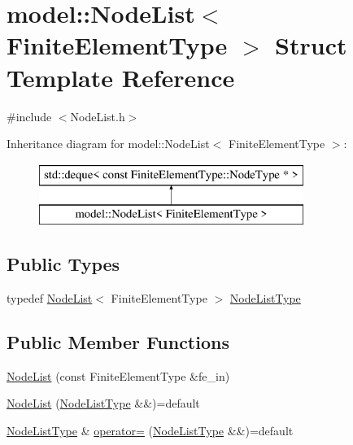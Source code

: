 \hypertarget{structmodel_1_1_node_list}{}\section{model\+:\+:Node\+List$<$ Finite\+Element\+Type $>$ Struct Template Reference}
\label{structmodel_1_1_node_list}


{\ttfamily \#include $<$Node\+List.\+h$>$}

Inheritance diagram for model\+:\+:Node\+List$<$ Finite\+Element\+Type $>$\+:\begin{figure}[H]
\begin{center}
\leavevmode
\includegraphics[height=2.000000cm]{structmodel_1_1_node_list}
\end{center}
\end{figure}
\subsection*{Public Types}
\begin{DoxyCompactItemize}
\item 
typedef \hyperlink{structmodel_1_1_node_list}{Node\+List}$<$ Finite\+Element\+Type $>$ \hyperlink{structmodel_1_1_node_list_a75ab0962bbd6a25440cfccbc5458fd5f}{Node\+List\+Type}
\end{DoxyCompactItemize}
\subsection*{Public Member Functions}
\begin{DoxyCompactItemize}
\item 
\hyperlink{structmodel_1_1_node_list_a63c6515a984f86f181910be861572676}{Node\+List} (const Finite\+Element\+Type \&fe\+\_\+in)
\item 
\hyperlink{structmodel_1_1_node_list_adcf55397a767c823301a9d32680176c0}{Node\+List} (\hyperlink{structmodel_1_1_node_list_a75ab0962bbd6a25440cfccbc5458fd5f}{Node\+List\+Type} \&\&)=default
\item 
\hyperlink{structmodel_1_1_node_list_a75ab0962bbd6a25440cfccbc5458fd5f}{Node\+List\+Type} \& \hyperlink{structmodel_1_1_node_list_a74608e1e5636f6f3897dd2edad33379f}{operator=} (\hyperlink{structmodel_1_1_node_list_a75ab0962bbd6a25440cfccbc5458fd5f}{Node\+List\+Type} \&\&)=default
\end{DoxyCompactItemize}
